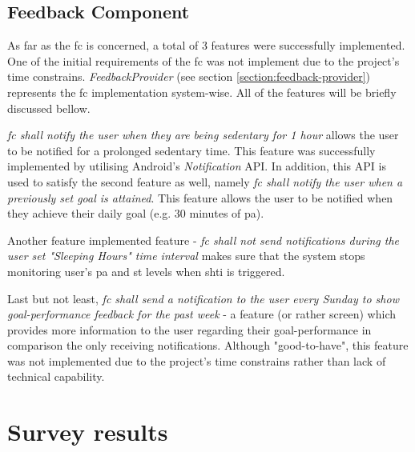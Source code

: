 \subsection{Feedback Component}
As far as the \gls{fc} is concerned, a total of 3 features were successfully implemented. One of the initial requirements of the \gls{fc} was not implement due to the project's time constrains. \textit{FeedbackProvider} (see section \ref{section:feedback-provider}) represents the \gls{fc} implementation system-wise. All of the features will be briefly discussed bellow.

\textit{\gls{fc} shall notify the user when they are being sedentary for 1 hour} allows the user to be notified for a prolonged sedentary time. This feature was successfully implemented by utilising Android's \textit{Notification} API. In addition, this API is used to satisfy the second feature as well, namely \textit{\gls{fc} shall notify the user when a previously set goal is attained}. This feature allows the user to be notified when they achieve their daily goal (e.g. 30 minutes of \gls{pa}).

Another feature implemented feature - \textit{\gls{fc} shall not send notifications during the user set "Sleeping Hours" time interval} makes sure that the system stops monitoring user's \gls{pa} and \gls{st} levels when \gls{shti} is triggered. 

Last but not least, \textit{\gls{fc} shall send a notification to the user every Sunday to show goal-performance feedback for the past week} - a feature (or rather screen) which provides more information to the user regarding their goal-performance in comparison the only receiving notifications. Although "good-to-have", this feature was not implemented due to the project's time constrains rather than lack of technical capability. 

\section{Survey results}

